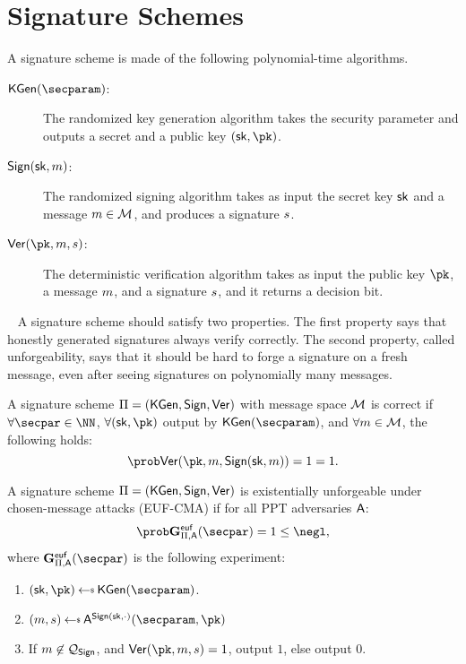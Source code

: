 \section{Signature Schemes}

A signature scheme is made of the following polynomial-time algorithms.

\begin{description}
    \item[$\kgen(\secparam)$:] The randomized key generation algorithm takes the security parameter  and  outputs a secret and a public key $(\sk, \pk)$.

    \item[$\mathsf{Sign}(\mathsf{sk}, m)$:] The randomized signing algorithm takes as input the secret key $\mathsf{sk}$ and a message $m\in\mathcal{M}$, and produces a signature $s$.

    \item[$\ver(\pk, \msg,\signature)$:] The deterministic verification algorithm takes as input the public key $\pk$, a message $m$, and a signature $s$, and it returns a decision bit.
\end{description}
~\newline
A signature scheme should satisfy two properties. The first property says that honestly generated signatures always verify correctly. The second property, called unforgeability, says that it should be hard to forge a signature on a fresh message, even after seeing signatures on polynomially many messages.

\begin{definition} \label{def:Sigcorrectness}
    A signature scheme $\Pi= (\mathsf{KGen}, \allowbreak \mathsf{Sign}, \mathsf{Ver})$ with message space $\mathcal{M}$ is correct if $\forall\secpar\in\NN$, $\forall (\sk, \pk)$ output by $\kgen(\allowbreak\secparam)$, and $\forall m \in \mathcal{M}$, the following holds:
    \[
        \Prob{\ver(\pk, \msg,\sign(\sk, \msg)) = 1} = 1.
    \]
\end{definition}

\begin{definition} \label{def:SigUnforgeability}
    A signature scheme $\Pi= (\allowbreak\mathsf{KGen}, \allowbreak \mathsf{Sign}, \mathsf{Ver})$ is existentially unforgeable under chosen-message attacks (EUF-CMA) if for all PPT adversaries $\mathsf{A}$:
    \[
        \Prob{\Sigeufgame_{\Pi,\adversary}(\secpar) = 1} \leq \negl,
    \]
    where $\Sigeufgame_{\Pi,\adversary}(\secpar)$ is the following experiment:
    \begin{enumerate}
        \item $(\sk, \pk) \getsr \kgen(\secparam)$.
        \item $(\msg, \signature) \getsr \adversary^{\sign(\sk, \cdot)}(\secparam, \pk)$
        \item If $m \not\in \mathcal{Q}_{\mathsf{Sign}}$, and $\ver(\pk,\msg, \signature) = 1$, output $1$, else output $0$.
    \end{enumerate}
\end{definition}